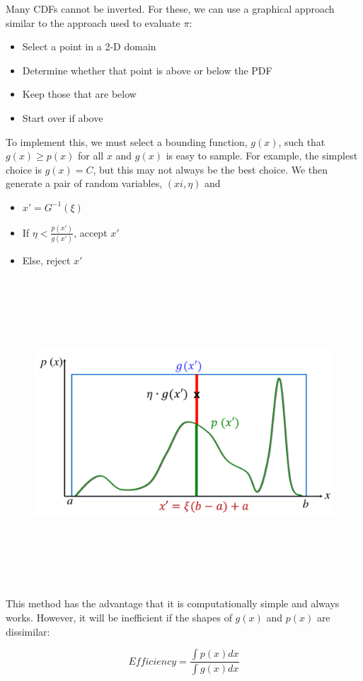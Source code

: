 \documentclass[12pt]{article}
\begin{document}
Many CDFs cannot be inverted.  
For these, we can use a graphical approach similar to the approach used to evaluate $\pi$:

\begin{itemize}
  \item Select a point in a 2-D domain
  \item Determine whether that point is above or below the PDF
  \item Keep those that are below
  \item Start over if above
\end{itemize}

To implement this, we must select a bounding function, $g(x)$, such that $g(x) \geq p(x)$ for all $x$ and $g(x)$ is easy to sample. 
For example, the simplest choice is $g(x)=C$, but this may not always be the best choice.
We then generate a pair of random variables, $(xi, \eta)$ and

\begin{itemize}
  \item $x' = G^{-1}(\xi)$
  \item If $\eta<\frac{p(x')}{g(x')}$, accept $x'$
  \item Else, reject $x'$
\end{itemize}

\begin{figure}
  \begin{center}
  \includegraphics[height=4.5in,clip]{../figs/rej-samp4.png}
  \end{center}
\end{figure}

This method has the advantage that it is computationally simple and always works.
However, it will be inefficient if the shapes of $g(x)$ and $p(x)$ are dissimilar:

\begin{equation}
  Efficiency = \frac{\int p(x)dx}{\int g(x)dx}
\end{equation}
\end{document}

